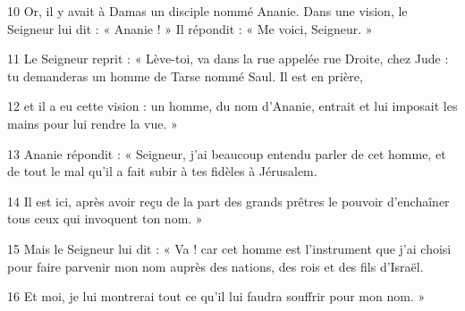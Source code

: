 
10 Or, il y avait à Damas un disciple nommé Ananie. Dans une vision, le Seigneur lui dit : « Ananie ! » Il répondit : « Me voici, Seigneur. »

11 Le Seigneur reprit : « Lève-toi, va dans la rue appelée rue Droite, chez Jude : tu demanderas un homme de Tarse nommé Saul. Il est en prière,

12 et il a eu cette vision : un homme, du nom d’Ananie, entrait et lui imposait les mains pour lui rendre la vue. »

13 Ananie répondit : « Seigneur, j’ai beaucoup entendu parler de cet homme, et de tout le mal qu’il a fait subir à tes fidèles à Jérusalem.

14 Il est ici, après avoir reçu de la part des grands prêtres le pouvoir d’enchaîner tous ceux qui invoquent ton nom. »

15 Mais le Seigneur lui dit : « Va ! car cet homme est l’instrument que j’ai choisi pour faire parvenir mon nom auprès des nations, des rois et des fils d’Israël.

16 Et moi, je lui montrerai tout ce qu’il lui faudra souffrir pour mon nom. »